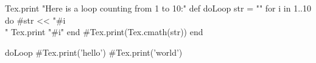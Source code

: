 \documentclass{article}
\begin{document}
\begin{rbtex}
Tex.print "Here is a loop counting from 1 to 10:"
def doLoop
    str = ""
    for i in 1..10 do
        #str << "#{i}\\ "
        Tex.print "#{i}"
    end
    #Tex.print(Tex.cmath(str))
end

doLoop
#Tex.print('hello')
#Tex.print('world')
\end{rbtex}
\end{document}
